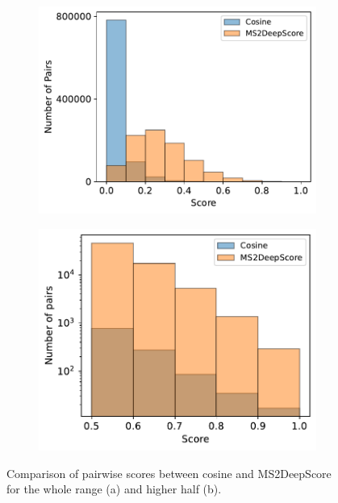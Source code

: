 \begin{figure}[h]
    \centering
	 \begin{subfigure}[b]{0.495\textwidth}
 		 \hspace{3cm}
 		 \centering
 		 \includegraphics[width=1\textwidth]{include/img/results/frequency_ms2ds_cosine.pdf}
 		 \caption{}
 	\end{subfigure}
 	\hfill
 		 \begin{subfigure}[b]{0.465\textwidth}
 		 \hspace{3cm}
 		 \centering
  		\includegraphics[width=1\textwidth]{include/img/results/frequency_ms2ds_cosine_05.pdf}
 		 \caption{}
 	\end{subfigure}
  \caption{Comparison of pairwise scores between cosine and MS2DeepScore for the whole range (a) and higher half (b).}
  \label{fig:comparison_cosine_ms2ds}
\end{figure}


